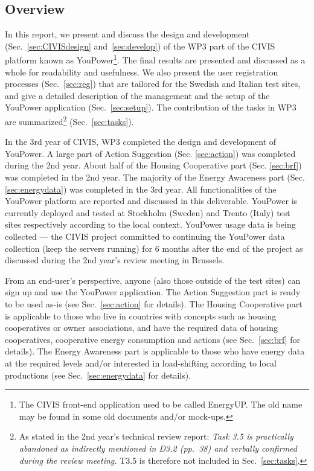 \subsection{Overview}

In this report, we present and discuss the design and development (Sec.~\ref{sec:CIVISdesign} and~\ref{sec:develop}) of the WP3 part of the CIVIS platform known as YouPower\footnote{The CIVIS front-end application used to be called EnergyUP. The old name may be found in some old documents and/or mock-ups.}. 
The final results are presented and discussed as a whole for readability and usefulness. 
% 
We also present the user registration processes (Sec.~\ref{sec:reg}) that are tailored for the Swedish and Italian test sites, and give a detailed description of the management and the setup of the YouPower application (Sec.~\ref{sec:setup}). The contribution of the tasks in WP3 are summarized\footnote{As stated in the 2nd year's technical review report: \textit{Task 3.5 is practically abandoned as indirectly mentioned in D3.2 (pp.~38) and verbally confirmed
during the review meeting.} T3.5 is therefore not included in Sec.~\ref{sec:tasks}.} (Sec.~\ref{sec:tasks}). 

In the 3rd year of CIVIS, WP3 completed the design and development of YouPower. A large part of Action Suggestion (Sec. \ref{sec:action}) was completed during the 2nd year. About half of the Housing Cooperative part (Sec. \ref{sec:brf}) was completed in the 2nd year. The majority of the Energy Awareness part (Sec. \ref{sec:energydata}) was completed in the 3rd year. 
All functionalities of the YouPower platform are reported and discussed in this deliverable. YouPower is currently deployed and tested at Stockholm (Sweden) and Trento (Italy) test sites respectively according to the local context. YouPower usage data is being collected --- the CIVIS project committed to continuing the YouPower data collection (keep the servers running) for 6 months after the end of the project as discussed during the 2nd year's review meeting in Brussels. 

From an end-user's perspective, anyone (also those outside of the test sites) can sign up and use the YouPower application. 
The Action Suggestion part is ready to be used as-is (see Sec.~\ref{sec:action} for details). The Housing Cooperative part is applicable to those who live in countries with concepts such as housing cooperatives or owner associations, and have the required data of housing cooperatives, cooperative energy consumption and actions (see Sec.~\ref{sec:brf} for details). The Energy Awareness part is applicable to those who have energy data at the required levels and/or interested in load-shifting according to local productions (see Sec.~\ref{sec:energydata} for details). 

